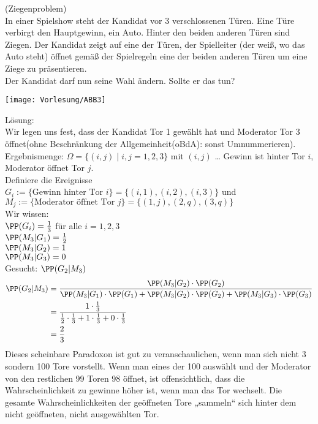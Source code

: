 \documentclass{scrreprt}
\begin{document}
 (Ziegenproblem)\\
In einer Spielshow steht der Kandidat vor $3$ verschlossenen Türen. Eine Türe verbirgt den Hauptgewinn, ein Auto. Hinter den beiden anderen Türen sind Ziegen. Der Kandidat zeigt auf eine der Türen, der Spielleiter (der weiß, wo das Auto steht) öffnet gemäß der Spielregeln eine der beiden anderen Türen um eine Ziege zu präsentieren. \\
Der Kandidat darf nun seine Wahl ändern. Sollte er das tun?
\begin{center}
\texttt{[image: Vorlesung/ABB3]}
\end{center}
Lösung: \\
Wir legen uns fest, dass der Kandidat Tor 1 gewählt hat und Moderator Tor 3 öffnet(ohne Beschränkung der Allgemeinheit(oBdA): sonst Umnummerieren).\\
Ergebnismenge: $\Omega = \{(i,j)\;|\; i,j=1,2,3\}$ mit $(i,j)$ … Gewinn ist hinter Tor $i$, Moderator öffnet Tor $j$.\\
Definiere die Ereignisse \\
$G_i:= \{ \text{Gewinn hinter Tor }i\}=\{(i,1), (i,2), (i,3)\}$ und\\
$M_j:=\{\text{Moderator öffnet Tor }j\}=\{(1,j), (2,q), (3,q)\}$\\
Wir wissen:\\
$\PP(G_i)=\frac{1}{3}$ für alle $i=1,2,3$\\
$\PP(M_3|G_1)=\tfrac{1}{2}$\\
$\PP(M_3|G_2)=1$\\
$\PP(M_3|G_3)=0$\\
Gesucht: $\PP(G_2|M_3)$
\begin{align*}
\PP(G_2|M_3)&=\frac{\PP(M_3|G_2)\cdot \PP(G_2)}{\PP(M_3|G_1)\cdot \PP(G_1)+\PP(M_3|G_2)\cdot \PP(G_2)+\PP(M_3|G_3)\cdot \PP(G_3)}\\
&=\frac{1\cdot \frac{1}{3}}{\frac{1}{2}\cdot \frac{1}{3}+1\cdot \frac{1}{3}+0\cdot \frac{1}{3}}\\
&=\frac{2}{3}
\end{align*}
Dieses scheinbare Paradoxon ist gut zu veranschaulichen, wenn man sich nicht 3 sondern 100 Tore vorstellt. Wenn man eines der 100 auswählt und der Moderator von den restlichen 99 Toren 98 öffnet, ist offensichtlich, dass die Wahrscheinlichkeit zu gewinne höher ist, wenn man das Tor wechselt. Die gesamte Wahrscheinlichkeiten der geöffneten Tore „sammeln“ sich hinter dem nicht geöffneten, nicht ausgewählten Tor.
\end{document}
